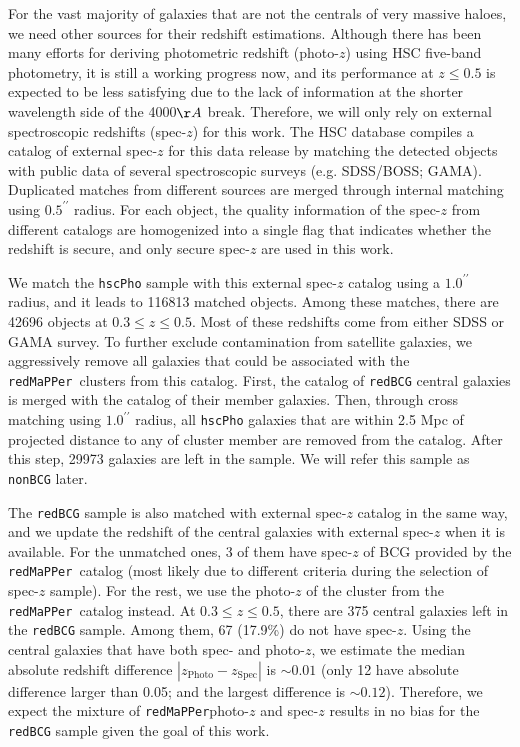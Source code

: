 \documentclass[preprint]{aastex}
\def\arcsec{{\prime\prime}}
\def\redm{\texttt{redMaPPer}}
\begin{document}
\begin{CJK*}{UTF8}{gbsn}
    For the vast majority of galaxies that are not the centrals of very massive haloes, we
    need other sources for their redshift estimations. 
    Although there has been many efforts for deriving photometric redshift (photo-$z$)
    using HSC five-band photometry, it is still a working progress now, and its
    performance at $z \leq 0.5$ is expected to be less satisfying due to the lack of
    information at the shorter wavelength side of the 4000$\AA$ break.  
    Therefore, we will only rely on external spectroscopic redshifts (spec-$z$) for this
    work.  
    The HSC database compiles a catalog of external spec-$z$ for this data release by
    matching the detected objects with public data of several spectroscopic surveys (e.g.
    SDSS/BOSS; GAMA). 
    Duplicated matches from different sources are merged through internal matching using
    $0.5^{\arcsec}$ radius. 
    For each object, the quality information of the spec-$z$ from different catalogs are 
    homogenized into a single flag that indicates whether the redshift is secure, and 
    only secure spec-$z$ are used in this work. 
    
    We match the \texttt{hscPho} sample with this external spec-$z$ catalog using a 
    $1.0^{\arcsec}$ radius, and it leads to 116813 matched objects.  
    Among these matches, there are 42696 objects at $0.3 \leq z \leq 0.5$. 
    Most of these redshifts come from either SDSS or GAMA survey.
    To further exclude contamination from satellite galaxies, we aggressively remove 
    all galaxies that could be associated with the \redm~clusters from this catalog.  
    First, the catalog of \texttt{redBCG} central galaxies is merged with the catalog  
    of their member galaxies. 
    Then, through cross matching using $1.0^{\arcsec}$ radius, all \texttt{hscPho} 
    galaxies that are within 2.5 Mpc of projected distance to any of cluster member 
    are removed from the catalog.  
    After this step, 29973 galaxies are left in the sample. 
    We will refer this sample as \texttt{nonBCG} later.

    The \texttt{redBCG} sample is also matched with external spec-$z$ catalog in the same
    way, and we update the redshift of the central galaxies with external spec-$z$ when 
    it is available.  
    For the unmatched ones, 3 of them have spec-$z$ of BCG provided by the \redm~catalog 
    (most likely due to different criteria during the selection of spec-$z$ sample).
    For the rest, we use the photo-$z$ of the cluster from the \redm~catalog instead.
    At $0.3 \leq z \leq 0.5$, there are 375 central galaxies left in the \texttt{redBCG} 
    sample. 
    Among them, 67 (17.9\%) do not have spec-$z$.
    Using the central galaxies that have both spec- and photo-$z$, we estimate the median 
    absolute redshift difference $|z_{\mathrm{Photo}} - z_{\mathrm{Spec}}|$ is 
    $\sim 0.01$ (only 12 have absolute difference larger than 0.05; and the largest 
    difference is $\sim 0.12$).  
    Therefore, we expect the mixture of \redm photo-$z$ and spec-$z$ results in no bias 
    for the \texttt{redBCG} sample given the goal of this work.  
    

\end{CJK*}
\end{document}
